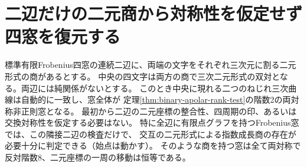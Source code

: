 \section{二辺だけの二元商から対称性を仮定せず四窓を復元する}
\label{sec:binary-two-edge-rigidity}
\begin{theorem}\label{thm:binary-two-edge-rigidity}
標準有限Frobenius四窓の連続二辺に、両端の文字をそれぞれ三次元に割る二元形式の商があるとする。
中央の四文字は両方の商で三次二元形式の双対となる。両辺には純関係がないとする。
このとき中央に現れる二つのねじれ三次曲線は自動的に一致し、窓全体が
定理\ref{thm:binary-apolar-rank-test}の階数2の両対称非正則窓となる。
最初から二辺の二元座標の整合性、四周期の印、あるいは交換対称性を仮定する必要はない。
特に全辺に有限点グラフを持つFrobenius窓では、この隣接二辺の検査だけで、
交互の二元形式による指数成長商の存在が必要十分に判定できる（始点は動かす）。
そのような商を持つ窓は全て両対称で反対階数8、二元座標の一周の移動は恒等である。
\end{theorem}

